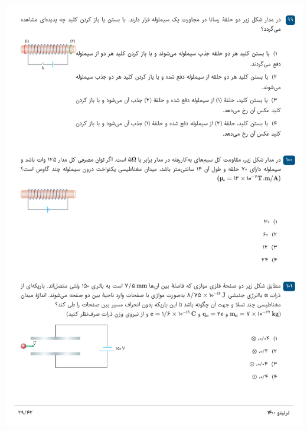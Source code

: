 \documentclass{book}
\begin{document}
\includegraphics[width=\textwidth]{"pages/29"}
\end{document}
